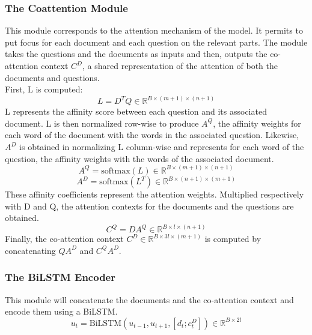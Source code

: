 \documentclass[letterpaper, 10 pt, conference]{ieeeconf}  %
\newcommand{\BiLSTM}{\text{BiLSTM}}
\newcommand{\softmax}{\text{softmax}}
\renewcommand{\Re}{\mathbb{R}}
\begin{document}
\subsubsection{The Coattention Module}


This module corresponds to the attention mechanism of the model. It permits to put focus for each document and each question on the relevant parts.
The module takes the questions and the documents as inputs and then, outputs the co-attention context $C^D$, a shared representation of the attention of both the documents and questions.\\
First, L is computed:
\begin{equation}
L=D^{T}Q \in\Re^{B \times (m+1)\times(n+1)}
\end{equation}
L represents the affinity score between each question and its associated document. L is then normalized row-wise to produce $A^Q$, the affinity weights for each word of the document with the words in the associated question. Likewise, $A^D$ is obtained in normalizing L column-wise and represents for each word of the question, the affinity weights with the words of the associated document.
\begin{equation}
A^Q= \softmax (L)\in \Re^{B \times(m+1)\times(n+1)}
\end{equation}
\begin{equation}
A^D= \softmax(L^T)\in \Re^{B \times(n+1)\times(m+1)}
\end{equation}
These affinity coefficients represent the attention weights. Multiplied respectively with D and Q, the attention contexts for the documents and the questions are obtained.  
\begin{equation}
C^Q=DA^Q \in \Re^{B \times l \times(n+1)}
\end{equation}
Finally, the co-attention context $C^D \in \Re^{B \times 3l \times(m+1)}$ is computed by concatenating $QA^D$ and $C^QA^D$.\\

\subsubsection{The BiLSTM Encoder}

This module will concatenate the documents and the co-attention context and encode them using a BiLSTM. 
\begin{equation}
u_t= \BiLSTM(u_{t-1},u_{t+1},[d_t;c_t^D])\in \Re^{B\times 2l}
\end{equation}
 
\end{document}
